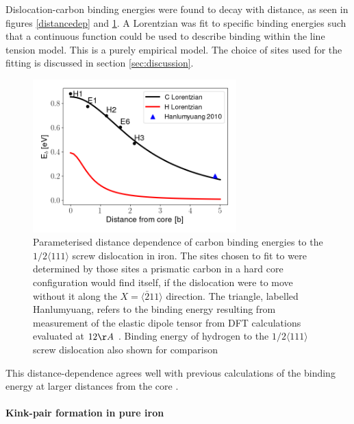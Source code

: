 \documentclass[a4paper,11pt]{article}
\numberwithin{equation}{chapter}
\numberwithin{listing}{chapter}
\begin{document}
Dislocation-carbon binding energies were found to decay with distance, as seen in figures
\ref{distancedep} and \ref{lorentzianfit}. A Lorentzian was fit to specific binding energies such
that a continuous function could be used to describe binding within
the line tension model. This is a purely empirical model. The
choice of sites used for the fitting is discussed in section
\ref{sec:discussion}.




\begin{figure}[htbp]
\centering
\includegraphics[width=0.7\textwidth]{iron/Images/binding_energy_dependence_C_H_lorentzian_with_scatter.png}
\caption{Parameterised distance dependence of carbon binding energies to the \(1/2\langle 111 \rangle\) screw dislocation in iron. The sites chosen to fit to were determined by those sites a prismatic carbon in a hard core configuration would find itself, if the dislocation were to move without it along the \(X = \langle\bar{2}11\rangle\) direction. The triangle, labelled Hanlumyuang, refers to the binding energy resulting from measurement of the elastic dipole tensor from DFT calculations evaluated at \(12\AA\) \cite{Hanlumyuang2010}. Binding energy of hydrogen to the \(1/2\langle 111 \rangle\) screw dislocation also shown for comparison \cite{itakura13_effec_hydrog_atoms_screw_disloc} \label{lorentzianfit}}
\end{figure}

This distance-dependence agrees well with previous calculations of the binding energy
at larger distances from the core \cite{Hanlumyuang2010}.

\paragraph{Kink-pair formation in pure iron}
\label{sec:org4b62651}
\end{document}
